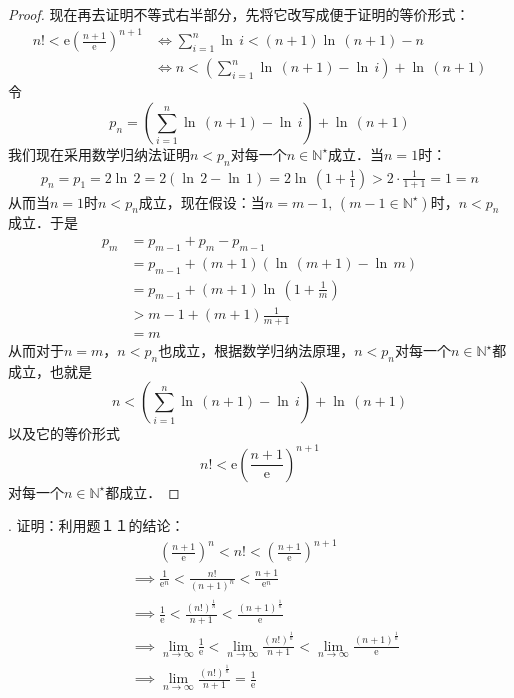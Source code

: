\begin{proof}
\noindent 现在再去证明不等式右半部分，先将它改写成便于证明的等价形式：
\begin{align}
    n! < \mathrm{e}\left(\frac{n+1}{\mathrm{e}}\right)^{n+1} &\iff \sum_{i=1}^n \ln \, i < (n+1)\ln \, \left(n+1\right) - n \\
    &\iff n < \left( \sum_{i=1}^n \ln \, \left(n+1\right) - \ln \, i \right) + \ln \, \left(n+1\right)
\end{align}
令
\begin{equation}
    p_n = \left( \sum_{i=1}^n \ln \, \left(n+1\right) - \ln \, i \right) + \ln \, \left(n+1\right)
\end{equation}
我们现在采用数学归纳法证明$n < p_n$对每一个$n\in\mathbb{N}^\star$成立．当$n=1$时：
\begin{align}
    p_n = p_1 = 2 \ln \, 2 = 2 \left( \ln \, 2 - \ln \, 1\right) = 2 \ln \, \left( 1 + \frac{1}{1} \right) > 2 \cdot \frac{1}{1+1} = 1 = n
\end{align}
从而当$n=1$时$n < p_n$成立，现在假设：当$n=m-1, \, (m-1 \in \mathbb{N}^\star)$时，$n < p_n$成立．于是
\begin{align}
    p_m &= p_{m-1} + p_{m} - p_{m-1} \\
    &= p_{m-1} + (m+1) \left( \ln \, \left(m+1\right) - \ln \, m \right) \\
    &= p_{m-1} + (m+1) \ln \, \left(1 + \frac{1}{m}\right) \\
    &> m-1 + (m+1) \frac{1}{m+1} \\
    &= m
\end{align}
从而对于$n=m$，$n < p_n$也成立，根据数学归纳法原理，$n < p_n$对每一个$n \in \mathbb{N}^\star$都成立，也就是
\begin{equation}
    n < \left( \sum_{i=1}^n \ln \, \left(n+1\right) - \ln \, i \right) + \ln \, \left(n+1\right)
\end{equation}
以及它的等价形式
\begin{equation}
    n! < \mathrm{e}\left(\frac{n+1}{\mathrm{e}}\right)^{n+1}
\end{equation}
对每一个$n \in \mathbb{N}^\star$都成立．
\end{proof}
. 证明：利用题１１的结论：
\begin{align}
    &\phantom{\implies} \left(\frac{n+1}{\mathrm{e}}\right)^n < n! < \left(\frac{n+1}{\mathrm{e}}\right)^{n+1} \\
    &\implies \frac{1}{\mathrm{e}^n} < \frac{n!}{(n+1)^n} < \frac{n+1}{\mathrm{e}^n} \\
    &\implies \frac{1}{\mathrm{e}} < \frac{(n!)^\frac{1}{n}}{n+1} < \frac{(n+1)^\frac{1}{n}}{\mathrm{e}} \\
    &\implies \lim_{n\to\infty} \frac{1}{\mathrm{e}} < \lim_{n \to \infty} \frac{(n!)^\frac{1}{n}}{n+1} < \lim_{n\to\infty} \frac{(n+1)^\frac{1}{n}}{\mathrm{e}} \\
    &\implies \lim_{n\to\infty} \frac{(n!)^\frac{1}{n}}{n+1} = \frac{1}{\mathrm{e}}
\end{align}
